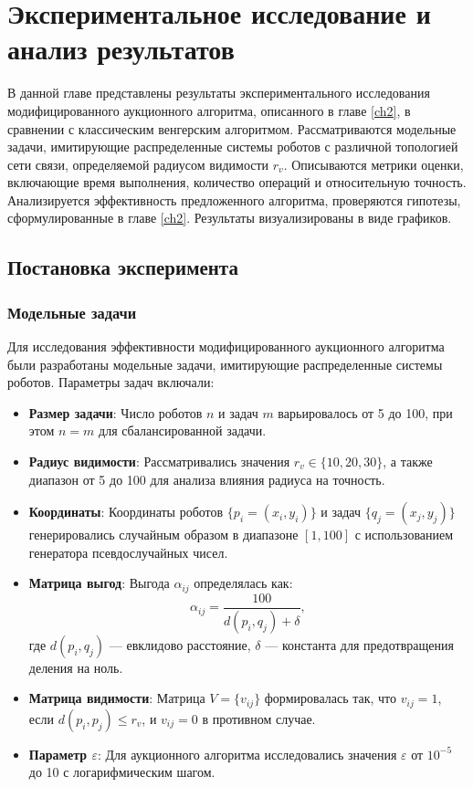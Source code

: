 \chapter{Экспериментальное исследование и анализ результатов}
\label{ch4}

\vspace{0.5cm}

В данной главе представлены результаты экспериментального исследования модифицированного аукционного алгоритма, описанного в главе \ref{ch2}, в сравнении с классическим венгерским алгоритмом. Рассматриваются модельные задачи, имитирующие распределенные системы роботов с различной топологией сети связи, определяемой радиусом видимости \( r_v \). Описываются метрики оценки, включающие время выполнения, количество операций и относительную точность. Анализируется эффективность предложенного алгоритма, проверяются гипотезы, сформулированные в главе \ref{ch2}. Результаты визуализированы в виде графиков.

\section{Постановка эксперимента}

\subsection{Модельные задачи}

\vspace{0.3cm}

Для исследования эффективности модифицированного аукционного алгоритма были разработаны модельные задачи, имитирующие распределенные системы роботов. Параметры задач включали:

\begin{itemize}
    \item \textbf{Размер задачи}: Число роботов \( n \) и задач \( m \) варьировалось от 5 до 100, при этом \( n = m \) для сбалансированной задачи.
    \item \textbf{Радиус видимости}: Рассматривались значения \( r_v \in \{10, 20, 30\} \), а также диапазон от 5 до 100 для анализа влияния радиуса на точность.
    \item \textbf{Координаты}: Координаты роботов \( \{p_i = (x_i, y_i)\} \) и задач \( \{q_j = (x_j, y_j)\} \) генерировались случайным образом в диапазоне \( [1, 100] \) с использованием генератора псевдослучайных чисел.
    \item \textbf{Матрица выгод}: Выгода \( \alpha_{ij} \) определялась как:
    \[
    \alpha_{ij} = \frac{100}{d(p_i, q_j) + \delta},
    \]
    где \( d(p_i, q_j) \) --- евклидово расстояние, \( \delta \) --- константа для предотвращения деления на ноль.
    \item \textbf{Матрица видимости}: Матрица \( V = \{v_{ij}\} \) формировалась так, что \( v_{ij} = 1 \), если \( d(p_i, p_j) \leq r_v \), и \( v_{ij} = 0 \) в противном случае.
    \item \textbf{Параметр \( \varepsilon \)}: Для аукционного алгоритма исследовались значения \( \varepsilon \) от \( 10^{-5} \) до 10 с логарифмическим шагом.
\end{itemize}

